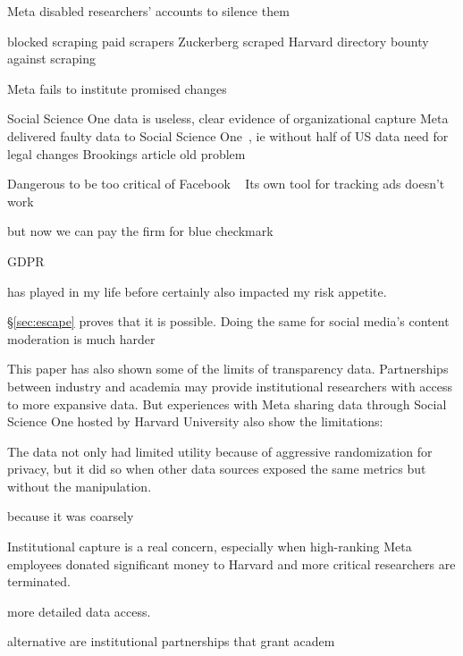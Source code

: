 {Meta disabled researchers' accounts \cite{EdelsonMcCoy2021,EdelsonMcCoy2021a}
to silence them \cite{Roose2021a}


blocked scraping \cite{Faife2021a,MerrillTobin2019}
paid scrapers \cite{Newman2023}
Zuckerberg scraped Harvard directory \cite{Madrigal2019}
bounty against scraping \cite{Gurfinkel2021}

Meta fails to institute promised changes
\cite{FaifeKerr2021,FaifeNg2021,Merrill2020,YinNg2021}

Social Science One data is useless, clear evidence of organizational capture
\cite{Hegelich2020,HegelichMarcoea2020}
Meta delivered faulty data  to Social Science One~\cite{Timberg2021},
ie without half of US data
need for legal changes   Brookings article
old problem~\cite{Ingram2022}

Dangerous to be too critical of Facebook ~\cite{SmithMatsakis2023}
Its own tool for tracking ads doesn't work \cite{Rosenberg2019}

but now we can pay the firm for blue checkmark \cite{Warzel2023}


GDPR \cite{Burgess2022}



has played in my life before certainly
also impacted my risk appetite.


\S\ref{sec:escape} proves that it is possible. Doing the same for social media's
content moderation is much harder


This paper has also shown some of the limits of transparency data. Partnerships
between industry and academia may provide institutional researchers with access
to more expansive data. But experiences with Meta sharing data through Social
Science One hosted by Harvard University also show the limitations:


The data not only had limited utility because of aggressive randomization for
privacy, but it did so when other data sources exposed the same metrics but
without the manipulation.





because it was coarsely


Institutional capture is a real concern, especially when high-ranking Meta
employees donated significant money to Harvard and more critical researchers are
terminated.



more detailed data access.


alternative are institutional partnerships that grant academ




}

